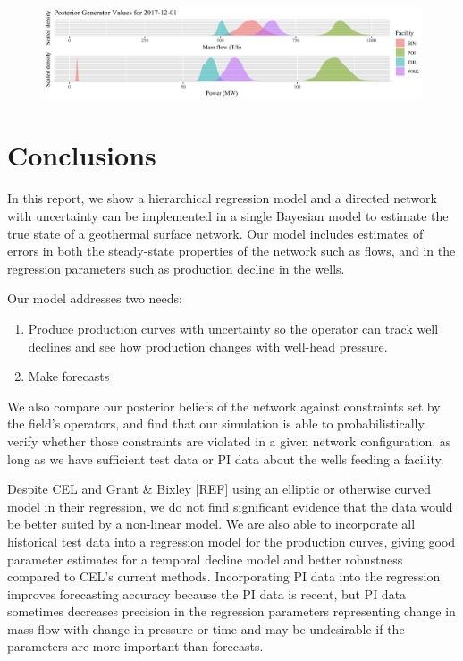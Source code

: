 \documentclass[a4paper, 12pt]{article}
\begin{document}
\begin{figure}
\centering
  \includegraphics[width=\linewidth]{media/gens}
  \label{fig:gens}
\end{figure}

\section{Conclusions}
In this report, we show a hierarchical regression model and a directed network with uncertainty can be implemented in a single Bayesian model to estimate the true state of a geothermal surface network. Our model includes estimates of errors in both the steady-state properties of the network such as flows, and in the regression parameters such as production decline in the wells.

Our model addresses two needs:
\begin{enumerate}
\item Produce production curves with uncertainty so the operator can track well declines and see how production changes with well-head pressure.
\item Make forecasts
\end{enumerate}
We also compare our posterior beliefs of the network against constraints set by the field's operators, and find that our simulation is able to probabilistically verify whether those constraints are violated in a given network configuration, as long as we have sufficient test data or PI data about the wells feeding a facility.

Despite CEL and Grant \& Bixley [REF] using an elliptic or otherwise curved model in their regression, we do not find significant evidence that the data would be better suited by a non-linear model. We are also able to incorporate all historical test data into a regression model for the production curves, giving good parameter estimates for a temporal decline model and better robustness compared to CEL's current methods. Incorporating PI data into the regression improves forecasting accuracy because the PI data is recent, but PI data sometimes decreases precision in the regression parameters representing change in mass flow with change in pressure or time and may be undesirable if the parameters are more important than forecasts.
\end{document}

